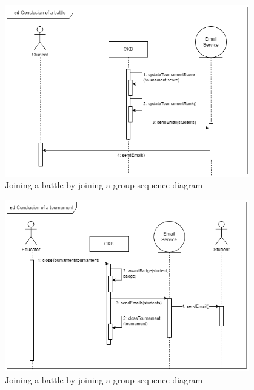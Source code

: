 \begin{figure}[H]
    \centering
    \includegraphics[width=0.95\textwidth]{images/seq_diagrams/battle_conclusion.png}
    \caption{Joining a battle by joining a group sequence diagram}
\end{figure}
\clearpage

\begin{figure}[H]
    \centering
    \includegraphics[width=0.95\textwidth]{images/seq_diagrams/tournament_conclusion.png}
    \caption{Joining a battle by joining a group sequence diagram}
\end{figure}
\clearpage


